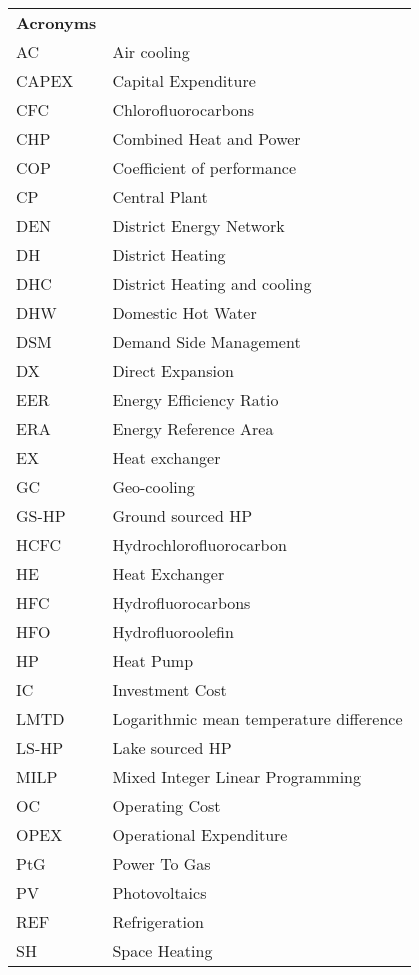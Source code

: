 \begin{table}[thp!]
	\centering
	\begin{tabular}{ll}
		\textbf{Acronyms} & \\
		AC & Air cooling \\
		CAPEX & Capital Expenditure \\
		CFC & Chlorofluorocarbons \\
		CHP & Combined Heat and Power \\
		COP & Coefficient of performance \\
		CP & Central Plant \\
		DEN & District Energy Network \\
		DH & District Heating \\
		DHC & District Heating and cooling \\
		DHW & Domestic Hot Water \\
		DSM & Demand Side Management \\
		DX & Direct Expansion \\
		EER & Energy Efficiency Ratio \\
		ERA & Energy Reference Area \\
		EX & Heat exchanger \\
		GC & Geo-cooling \\
		GS-HP & Ground sourced HP \\
		HCFC & Hydrochlorofluorocarbon \\
		HE & Heat Exchanger \\
		HFC & Hydrofluorocarbons \\
		HFO & Hydrofluoroolefin \\
		HP & Heat Pump \\
		IC & Investment Cost \\
		LMTD & Logarithmic mean temperature difference \\
		LS-HP & Lake sourced HP \\
		MILP & Mixed Integer Linear Programming \\
		OC & Operating Cost \\
		OPEX & Operational Expenditure \\
		PtG & Power To Gas \\
		PV & Photovoltaics \\
		REF & Refrigeration \\
		SH & Space Heating \\

\end{tabular}
\end{table}
